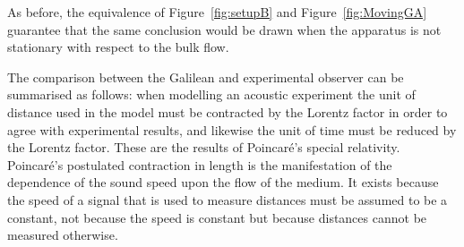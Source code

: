 \documentclass[10pt, fleqn,final,showtrims,oldfontcommands, article,a4paper,oneside]{memoir} %
\newcommand{\eqnref}[1]{\ref{eqn:#1}}
\newcommand{\figref}[1]{Figure~\ref{fig:#1}}
\newcommand{\Poincare}{Poincar{\'e}\xspace}
\begin{document}

As before, the equivalence of \figref{setupB} and \figref{MovingGA} guarantee that the same conclusion 
would be drawn when the apparatus is not stationary with respect to the bulk flow.

The comparison between the Galilean and experimental observer can be summarised as follows:
when modelling an acoustic experiment 
the  unit of distance used in the model must be
contracted by the Lorentz factor in order to agree with experimental results,
and likewise the unit of time must be reduced by the Lorentz factor.
These are the results of \Poincare's special relativity.
\Poincare's postulated contraction in length is the manifestation of the dependence of the sound speed upon
the flow of the medium.
It  exists because  the speed of a  signal that is used to measure distances must be assumed to be a constant,
not because the speed is constant but because distances cannot be measured otherwise.



%
%
%
%
\end{document}
